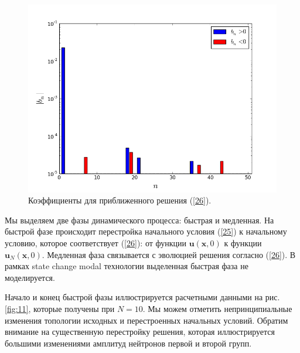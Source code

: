 \documentclass[authoryear]{elsarticle}
\begin{document}
\begin{figure}[!h]
  \begin{center}
    \includegraphics[width=0.95\linewidth] {10.png}
	\caption{Коэффициенты для приближенного решения (\ref{26}).}
	\label{fig:10}
  \end{center}
\end{figure} 

Мы выделяем две фазы динамического процесса: быстрая и медленная.
На быстрой фазе происходит перестройка начального условия (\ref{25}) 
к начальному условию, которое соответствует (\ref{26}): от функции
$\bm u(\bm x, 0)$ к функции $\bm u_N(\bm x, 0)$. Медленная фаза связывается с эволюцией
решения согласно (\ref{26}).
В рамках state change modal технологии выделенная быстрая фаза не моделируется.

Начало и конец быстрой фазы иллюстрируется расчетными данными на рис.\ref{fig:11},
которые получены при $N=10$. Мы можем отметить непринципиальные изменения 
топологии исходных и перестроенных начальных условий. 
Обратим внимание на существенную перестройку решения, которая
иллюстрируется большими изменениями амплитуд нейтронов первой и второй групп.
\end{document}
